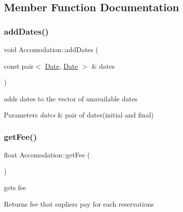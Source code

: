 \subsection{Member Function Documentation}
\hypertarget{class_accomodation_aefbbf86e80b202ca4879fb695cdb7d3d}{}\label{class_accomodation_aefbbf86e80b202ca4879fb695cdb7d3d} 
\subsubsection{\texorpdfstring{add\+Dates()}{addDates()}}
{\footnotesize\ttfamily void Accomodation\+::add\+Dates (\begin{DoxyParamCaption}\item[{const pair$<$ \hyperlink{class_date}{Date}, \hyperlink{class_date}{Date} $>$ \&}]{dates }\end{DoxyParamCaption})}



adds dates to the vector of unavailable dates 


\begin{DoxyParams}{Parameters}
{\em dates} & pair of dates(initial and final) \\
\hline
\end{DoxyParams}
\hypertarget{class_accomodation_aa37ad0d3356128f880c00b647d2f2bff}{}\label{class_accomodation_aa37ad0d3356128f880c00b647d2f2bff} 
\subsubsection{\texorpdfstring{get\+Fee()}{getFee()}}
{\footnotesize\ttfamily float Accomodation\+::get\+Fee (\begin{DoxyParamCaption}{ }\end{DoxyParamCaption})\hspace{0.3cm}{\ttfamily [inline]}}



gets fee 

\begin{DoxyReturn}{Returns}
fee that supliers pay for each reservations 
\end{DoxyReturn}
\hypertarget{class_accomodation_a04d05660220ad6ad31619bdf9bab28e9}{}\label{class_accomodation_a04d05660220ad6ad31619bdf9bab28e9} 
